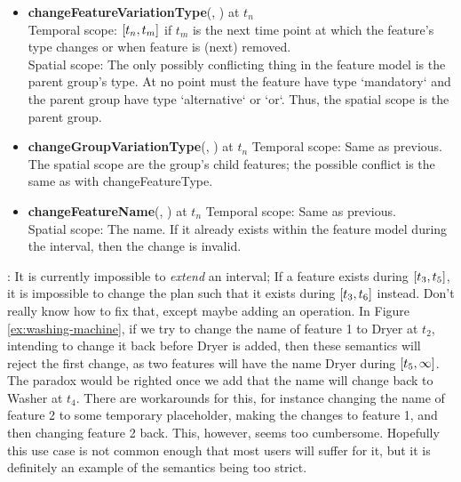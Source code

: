 \begin{itemize}
  \item \textbf{changeFeatureVariationType}(, ) at $t_n$\\
    Temporal scope: $\interval{t_n}{t_m}$ if $t_m$ is the next time point at which the feature's type changes or when feature is (next) removed.\\
    Spatial scope: The only possibly conflicting thing in the feature model is the parent group's type. At no point must the feature have type `mandatory` and the parent group have type `alternative` or `or`. Thus, the spatial scope is the parent group.\\
  \item \textbf{changeGroupVariationType}(, ) at $t_n$
    Temporal scope: Same as previous.\\
    The spatial scope are the group's child features; the possible conflict is the same as with changeFeatureType.\\
  \item \textbf{changeFeatureName}(, ) at $t_n$
    Temporal scope: Same as previous.\\
    Spatial scope: The name. If it already exists within the feature model during the interval, then the change is invalid. 
\end{itemize}

: It is currently impossible to \emph{extend} an interval; If a feature exists during $\interval{t_3}{t_5}$, it is impossible to change the plan such that it exists during $\interval{t_3}{t_6}$ instead. Don't really know how to fix that, except maybe adding an operation. In Figure \vref{ex:washing-machine}, if we try to change the name of feature 1 to Dryer at $t_2$, intending to change it back before Dryer is added, then these semantics will reject the first change, as two features will have the name Dryer during $\interval{t_5}{\infty}$. The paradox would be righted once we add that the name will change back to Washer at $t_4$. There are workarounds for this, for instance changing the name of feature 2 to some temporary placeholder, making the changes to feature 1, and then changing feature 2 back. This, however, seems too cumbersome. Hopefully this use case is not common enough that most users will suffer for it, but it is definitely an example of the semantics being too strict. 
